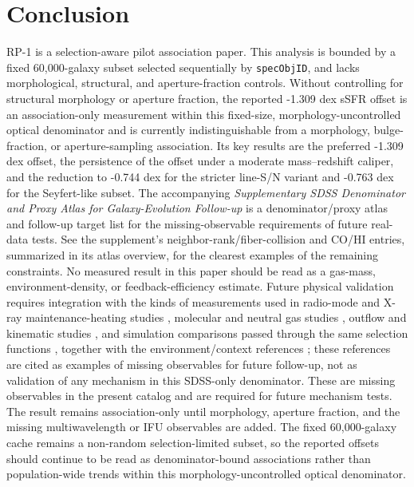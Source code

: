 \documentclass[twocolumn]{aastex631}
\begin{document}
\section{Conclusion}
RP-1 is a selection-aware pilot association paper. This analysis is bounded by a fixed 60,000-galaxy subset selected sequentially by \texttt{specObjID}, and lacks morphological, structural, and aperture-fraction controls. Without controlling for structural morphology or aperture fraction, the reported -1.309 dex sSFR offset is an association-only measurement within this fixed-size, morphology-uncontrolled optical denominator and is currently indistinguishable from a morphology, bulge-fraction, or aperture-sampling association. Its key results are the preferred -1.309 dex offset, the persistence of the offset under a moderate mass--redshift caliper, and the reduction to -0.744 dex for the stricter line-S/N variant and -0.763 dex for the Seyfert-like subset. The accompanying \emph{Supplementary SDSS Denominator and Proxy Atlas for Galaxy-Evolution Follow-up} is a denominator/proxy atlas and follow-up target list for the missing-observable requirements of future real-data tests. See the supplement's neighbor-rank/fiber-collision and CO/HI entries, summarized in its atlas overview, for the clearest examples of the remaining constraints. No measured result in this paper should be read as a gas-mass, environment-density, or feedback-efficiency estimate.
Future physical validation requires integration with the kinds of measurements used in radio-mode and X-ray maintenance-heating studies \citep{best2005,fabian2012,mcnamara2007,heckmanbest2014,lamassa2013}, molecular and neutral gas studies \citep{xcoldgass2017,xgass2018}, outflow and kinematic studies \citep{veilleux2005,cicone2014,carniani2017,fiore2017}, and simulation comparisons passed through the same selection functions \citep{simba2019,tng2019,eagle2015}, together with the environment/context references \citep{peng2010,ellison2011,piotrowska2022,wetzel2013,dekel2006}; these references are cited as examples of missing observables for future follow-up, not as validation of any mechanism in this SDSS-only denominator. These are missing observables in the present catalog and are required for future mechanism tests. The result remains association-only until morphology, aperture fraction, and the missing multiwavelength or IFU observables are added. The fixed 60,000-galaxy cache remains a non-random selection-limited subset, so the reported offsets should continue to be read as denominator-bound associations rather than population-wide trends within this morphology-uncontrolled optical denominator.
\end{document}
